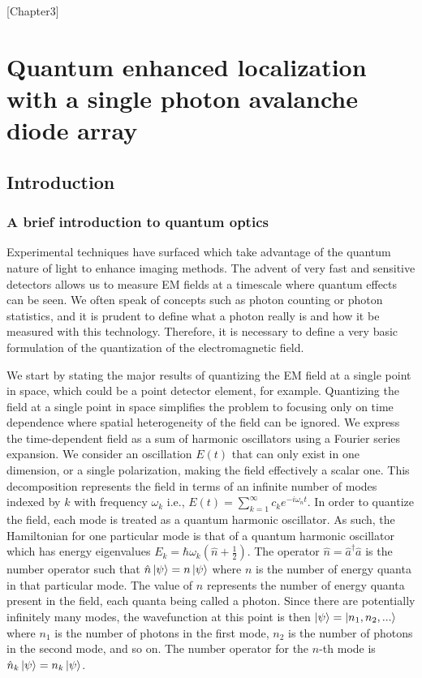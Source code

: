 [Chapter3]

\chapter{Quantum enhanced localization with a single photon avalanche diode array}

\section{Introduction}

\subsection{A brief introduction to quantum optics}

Experimental techniques have surfaced which take advantage of the quantum nature of light to enhance imaging methods. The advent of very fast and sensitive detectors allows us to measure EM fields at a timescale where quantum effects can be seen. We often speak of concepts such as photon counting or photon statistics, and it is prudent to define what a photon really is and how it be measured with this technology. Therefore, it is necessary to define a very basic formulation of the quantization of the electromagnetic field. 

We start by stating the major results of quantizing the EM field at a single point in space, which could be a point detector element, for example. Quantizing the field at a single point in space simplifies the problem to focusing only on time dependence where spatial heterogeneity of the field can be ignored. We express the time-dependent field as a sum of harmonic oscillators using a Fourier series expansion. We consider an oscillation $E(t)$ that can only exist in one dimension, or a single polarization, making the field effectively a scalar one. This decomposition represents the field in terms of an infinite number of modes indexed by $k$ with frequency $\omega_{k}$ i.e., $E(t) = \sum_{k=1}^\infty c_{k}e^{-i\omega_{n} t}$. In order to quantize the field, each mode is treated as a quantum harmonic oscillator. As such, the Hamiltonian for one particular mode is that of a quantum harmonic oscillator which has energy eigenvalues $E_{k} = \hbar\omega_{k}(\hat{n} + \frac{1}{2})$. The operator $\hat{n}=\hat{a}^{\dagger}\hat{a}$ is the number operator such that $\hat{n}\ket{\psi} = n\ket{\psi}$ where $n$ is the number of energy quanta in that particular mode. The value of $n$ represents the number of energy quanta present in the field, each quanta being called a photon. Since there are potentially infinitely many modes, the wavefunction at this point is then $\ket{\psi} = \ket{n_{1},n_{2},...}$ where $n_1$ is the number of photons in the first mode, $n_2$ is the number of photons in the second mode, and so on. The number operator for the $n$-th mode is $\hat{n}_k\ket{\psi} = n_{k}\ket{\psi}$. 

